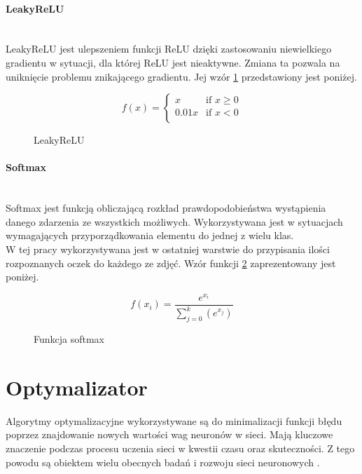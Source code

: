 \paragraph{LeakyReLU} \mbox{}\\
LeakyReLU jest ulepszeniem funkcji ReLU \cite{CS231n_activ} dzięki zastosowaniu niewielkiego
gradientu w sytuacji, dla której ReLU jest nieaktywne. Zmiana ta pozwala na uniknięcie
problemu znikającego gradientu. Jej wzór \ref{eq:leakyrelu} przedstawiony jest poniżej.
\begin{figure}[h!]
\renewcommand{\figurename}{Wzór}%
\begin{equation*}
f(x) =
\begin{cases}
x & \text{if } x \geqslant 0 \\
0.01x & \text{if } x < 0 \\
\end{cases}
\end{equation*}
\caption{LeakyReLU}
\label{eq:leakyrelu}
\end{figure}

\paragraph{Softmax} \mbox{}\\
Softmax jest funkcją obliczającą rozkład prawdopodobieństwa wystąpienia danego zdarzenia
ze wszystkich możliwych. Wykorzystywana jest w sytuacjach wymagających przyporządkowania
elementu do jednej z wielu klas. \\W tej pracy wykorzystywana jest w ostatniej warstwie do
przypisania ilości rozpoznanych oczek do każdego ze zdjęć. Wzór funkcji \ref{eq:softmax} zaprezentowany jest poniżej.
\begin{figure}[h!]
\renewcommand{\figurename}{Wzór}%
\begin{equation*}
f(x_{i}) = \frac{e^{x_{i}}} {\sum_{j = 0}^{k}(e^{x_{j}})}
\end{equation*}
\caption{Funkcja softmax}
\label{eq:softmax}
\end{figure}

\section{Optymalizator}

Algorytmy optymalizacyjne wykorzystywane są do minimalizacji funkcji błędu poprzez
znajdowanie nowych wartości wag neuronów w sieci. Mają kluczowe
znaczenie podczas procesu uczenia sieci w kwestii czasu oraz skuteczności.
Z tego powodu są obiektem wielu obecnych badań i rozwoju sieci
neuronowych \cite{typesOfOptimizationAlgorithms}.

